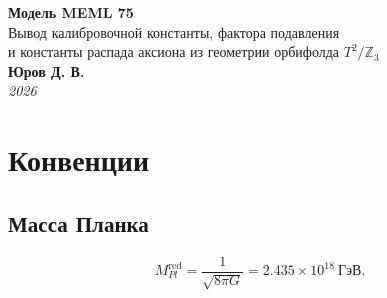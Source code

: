 \documentclass[12pt,a4paper]{article}
\numberwithin{equation}{section}
\begin{document}
\begin{center}
    {\LARGE\bf Модель MEML 75}\\[0.3cm]
    {\large Вывод калибровочной константы, фактора подавления\\
    и константы распада аксиона из геометрии орбифолда $T^2/\mathbb{Z}_3$}\\[0.5cm]
    {\bf Юров Д. В.}\\[0.2cm]
    {\it 2026}
\end{center}

\vspace{0.5cm}

\begin{abstract}
Версия MEML~75 развивает аксионную парадигму на орбифолде 
$T^2/\mathbb{Z}_3$ в шестимерном пространстве-времени. Bulk-константа 
связи $\alpha_G = 2/(3\pi) = 0.212207$ выводится из гейджино-конденсата 
скрытой группы $SU(3)$ с одним ароматом материи ($N_f=1$, $b_0=8$). 
Фактор подавления $\varepsilon = 2.860924\times 10^{-4}$ выводится 
из суммирования по спектру Калуцы--Клейна. Используется стандартная 
конвенция приведённой массы Планка $M_{Pl}^{\text{red}} = 
2.435\times 10^{18}$~ГэВ, что даёт масштаб компактификации 
$m_{KK} = 2.084\times 10^{14}$~ГэВ и 6D фундаментальный масштаб 
$M_6 = 2.965\times 10^{16}$~ГэВ, естественным образом совпадающий 
с масштабом Великого Объединения. \textbf{Ключевой результат:} 
константа распада аксиона выводится из первых принципов как 
$f_a = M_{Pl}^{\text{red}}\varepsilon^2 = 1.993\times 10^{11}$~ГэВ, 
без каких-либо феноменологических нормировок. Это даёт массу аксиона 
$m_a = 28.22$~мкэВ и резонансную частоту $\nu_a = 6.825$~ГГц, 
попадающую в диапазон высокочастотных галоскопов ADMX-HF / HAYSTAC / 
CAPP. Связь аксиона с фотонами составляет 
$|g_{a\gamma\gamma}| = 1.119\times 10^{-14}$~ГэВ$^{-1}$. 
Плотность тёмной материи $\Omega_a h^2 = 0.119832$ (Planck 2018: 
$0.120 \pm 0.001$) воспроизводится при начальном угле смещения 
$\theta_i = 2.0043$. Начальный угол $\theta_i$ является 
\textbf{начальным условием} космологической эволюции аксиона и не 
является параметром теории. Единственный калибровочный параметр 
модели~---~глубина варп-ямы $k = 0.1068$.
\end{abstract}

\section{Конвенции}
\label{sec:conventions}

\subsection{Масса Планка}
\begin{equation}
M_{Pl}^{\text{red}} = \frac{1}{\sqrt{8\pi G}} 
= 2.435\times 10^{18}~\text{ГэВ}.
\end{equation}
\end{document}

